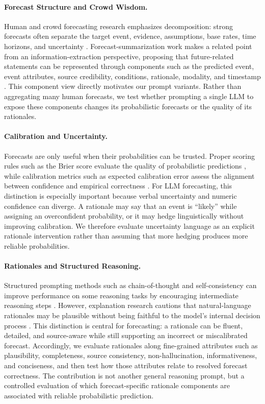 \documentclass[11pt]{article}
\begin{document}
\paragraph{Forecast Structure and Crowd Wisdom.}
Human and crowd forecasting research emphasizes decomposition: strong forecasts often separate the target event, evidence, assumptions, base rates, time horizons, and uncertainty \cite{tetlock2015superforecasting}.
Forecast-summarization work makes a related point from an information-extraction perspective, proposing that future-related statements can be represented through components such as the predicted event, event attributes, source credibility, conditions, rationale, modality, and timestamp \cite{saha2025wisdom}.
This component view directly motivates our prompt variants.
Rather than aggregating many human forecasts, we test whether prompting a single LLM to expose these components changes its probabilistic forecasts or the quality of its rationales.

\paragraph{Calibration and Uncertainty.}
Forecasts are only useful when their probabilities can be trusted.
Proper scoring rules such as the Brier score evaluate the quality of probabilistic predictions \cite{brier1950verification}, while calibration metrics such as expected calibration error assess the alignment between confidence and empirical correctness \cite{guo2017calibration}.
For LLM forecasting, this distinction is especially important because verbal uncertainty and numeric confidence can diverge.
A rationale may say that an event is ``likely'' while assigning an overconfident probability, or it may hedge linguistically without improving calibration.
We therefore evaluate uncertainty language as an explicit rationale intervention rather than assuming that more hedging produces more reliable probabilities.

\paragraph{Rationales and Structured Reasoning.}
Structured prompting methods such as chain-of-thought and self-consistency can improve performance on some reasoning tasks by encouraging intermediate reasoning steps \cite{wei2022chain,wang2023selfconsistency}.
However, explanation research cautions that natural-language rationales may be plausible without being faithful to the model's internal decision process \cite{jacovi2020towards,wiegreffe2019attention}.
This distinction is central for forecasting: a rationale can be fluent, detailed, and source-aware while still supporting an incorrect or miscalibrated forecast.
Accordingly, we evaluate rationales along fine-grained attributes such as plausibility, completeness, source consistency, non-hallucination, informativeness, and conciseness, and then test how those attributes relate to resolved forecast correctness.
The contribution is not another general reasoning prompt, but a controlled evaluation of which forecast-specific rationale components are associated with reliable probabilistic prediction.
\end{document}
